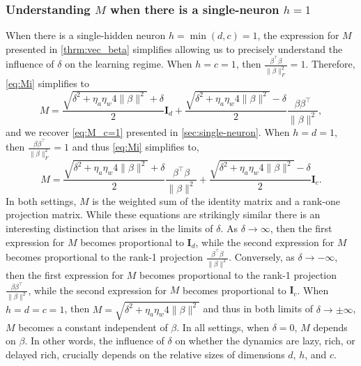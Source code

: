 \documentclass{article}
\theoremstyle{plain}
\theoremstyle{definition}
\theoremstyle{remark}
\begin{document}
\subsubsection{Understanding \texorpdfstring{$M$}{} when there is a single-neuron \texorpdfstring{$h = 1$}{}}
\label{app:wide-deep-linear-network-single-neuron}

When there is a single-hidden neuron $h = \min (d, c) = 1$, the expression for $M$ presented in \cref{thrm:vec_beta} simplifies allowing us to precisely understand the influence of $\delta$ on the learning regime.
%
When $h = c = 1 $, then $\frac{\beta^\intercal\beta}{\|\beta\|_F^2} = 1$.
%
Therefore, \cref{eq:Mi} simplifies to
\begin{equation}
        M = \frac{\sqrt{\delta^2 + \eta_a \eta_w 4\|\beta\|^2} + \delta}{2}\mathbf{I}_d + \frac{\sqrt{\delta^2 + \eta_a \eta_w 4\|\beta\|^2} - \delta}{2}\frac{\beta\beta^\intercal}{\|\beta\|^2},
\end{equation}
and we recover \cref{eq:M_c=1} presented in \cref{sec:single-neuron}.
%
When $h = d = 1 $, then $\frac{\beta\beta^\intercal}{\|\beta\|_F^2} = 1$ and thus \cref{eq:Mi} simplifies to,
\begin{equation}
        M = \frac{\sqrt{\delta^2 + \eta_a \eta_w 4\|\beta\|^2} + \delta}{2}\frac{\beta^\intercal\beta}{\|\beta\|^2} + \frac{\sqrt{\delta^2 + \eta_a \eta_w 4\|\beta\|^2} - \delta}{2}\mathbf{I}_c.
\end{equation}
In both settings, $M$ is the weighted sum of the identity matrix and a rank-one projection matrix.
%
While these equations are strikingly similar there is an interesting distinction that arises in the limits of $\delta$.
%
As $\delta \to \infty$, then the first expression for $M$ becomes proportional to $\mathbf{I}_d$, while the second expression for $M$ becomes proportional to the rank-1 projection $\frac{\beta^\intercal\beta}{\|\beta\|^2}$.
%
Conversely, as $\delta \to -\infty$, then the first expression for $M$ becomes proportional to the rank-1 projection $\frac{\beta\beta^\intercal}{\|\beta\|^2}$, while the second expression for $M$ becomes proportional to $\mathbf{I}_c$. 
%
When $h = d = c = 1$, then $M = \sqrt{\delta^2 + \eta_a \eta_w 4\|\beta\|^2}$ and thus in both limits of $\delta \to \pm \infty$, $M$ becomes a constant independent of $\beta$.
%
In all settings, when $\delta = 0$, $M$ depends on $\beta$.
%
In other words, the influence of $\delta$ on whether the dynamics are lazy, rich, or delayed rich, crucially depends on the relative sizes of dimensions $d$, $h$, and $c$.
\end{document}
